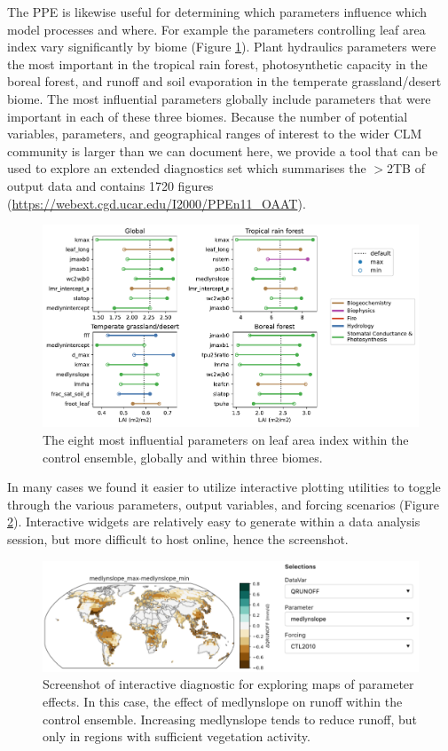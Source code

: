 \documentclass[draft]{agujournal2019}
\begin{document}
The PPE is likewise useful for determining which parameters influence which model processes and where. For example the parameters controlling leaf area index vary significantly by biome (Figure \ref{fig:lai}). Plant hydraulics parameters were the most important in the tropical rain forest, photosynthetic capacity in the boreal forest, and runoff and soil evaporation in the temperate grassland/desert biome. The most influential parameters globally include parameters that were important in each of these three biomes. Because the number of potential variables, parameters, and geographical ranges of interest to the wider CLM community is larger than we can document here,  we provide a tool that can be used to explore an extended diagnostics set which summarises the $>$2TB of output data and contains 1720 figures (\url{https://webext.cgd.ucar.edu/I2000/PPEn11_OAAT}). 

\begin{figure}[h]
\centering
\includegraphics[width=\textwidth]{../figs/lai_biome.pdf}
\caption{The eight most influential parameters on leaf area index within the control ensemble, globally and within three biomes.}
\label{fig:lai}
\end{figure}

In many cases we found it easier to utilize interactive plotting utilities to toggle through the various parameters, output variables, and forcing scenarios (Figure \ref{fig:panel}). Interactive widgets are relatively easy to generate within a data analysis session, but more difficult to host online, hence the screenshot.

\begin{figure}[h]
\centering
\includegraphics[width=\textwidth]{../figs/deltmap_panel.pdf}
\caption{Screenshot of interactive diagnostic for exploring maps of parameter effects. In this case, the effect of medlynslope on runoff within the control ensemble. Increasing medlynslope tends to reduce runoff, but only in regions with sufficient vegetation activity.}
\label{fig:panel}
\end{figure}
\end{document}
